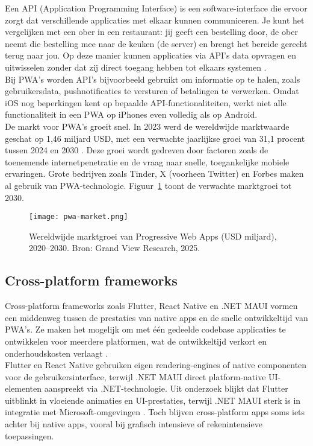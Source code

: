 Een API (Application Programming Interface) is een software-interface die ervoor zorgt dat verschillende applicaties met elkaar kunnen communiceren. Je kunt het vergelijken met een ober in een restaurant: jij geeft een bestelling door, de ober neemt die bestelling mee naar de keuken (de server) en brengt het bereide gerecht terug naar jou. Op deze manier kunnen applicaties via API’s data opvragen en uitwisselen zonder dat zij direct toegang hebben tot elkaars systemen \autocite{Schoemaker2019}.\\  

Bij PWA’s worden API’s bijvoorbeeld gebruikt om informatie op te halen, zoals gebruikersdata, pushnotificaties te versturen of betalingen te verwerken. Omdat iOS nog beperkingen kent op bepaalde API-functionaliteiten, werkt niet alle functionaliteit in een PWA op iPhones even volledig als op Android.\\  

De markt voor PWA’s groeit snel. In 2023 werd de wereldwijde marktwaarde geschat op 1,46 miljard USD, met een verwachte jaarlijkse groei van 31,1 procent tussen 2024 en 2030 \autocite{Research2024}. Deze groei wordt gedreven door factoren zoals de toenemende internetpenetratie en de vraag naar snelle, toegankelijke mobiele ervaringen. Grote bedrijven zoals Tinder, X (voorheen Twitter) en Forbes maken al gebruik van PWA-technologie. Figuur~\ref{fig:pwa_market} toont de verwachte marktgroei tot 2030.\\  


\begin{figure}[h]
    \centering
    \texttt{[image: pwa-market.png]}
    \caption{Wereldwijde marktgroei van Progressive Web Apps (USD miljard), 2020–2030. Bron: Grand View Research, 2025. \autocite{Research2024}}
    \label{fig:pwa_market}
\end{figure}

\subsection{Cross-platform frameworks}
Cross-platform frameworks zoals Flutter, React Native en .NET MAUI vormen een middenweg tussen de prestaties van native apps en de snelle ontwikkeltijd van PWA’s. Ze maken het mogelijk om met één gedeelde codebase applicaties te ontwikkelen voor meerdere platformen, wat de ontwikkeltijd verkort en onderhoudskosten verlaagt \autocite{Kuppan2024}.\\

Flutter en React Native gebruiken eigen rendering-engines of native componenten voor de gebruikersinterface, terwijl .NET MAUI direct platform-native UI-elementen aanspreekt via .NET-technologie. Uit onderzoek blijkt dat Flutter uitblinkt in vloeiende animaties en UI-prestaties, terwijl .NET MAUI sterk is in integratie met Microsoft-omgevingen \autocite{Gajjam2025}. Toch blijven cross-platform apps soms iets achter bij native apps, vooral bij grafisch intensieve of rekenintensieve toepassingen.

